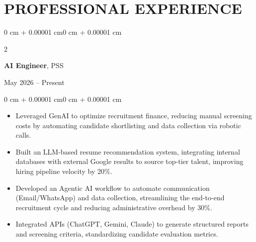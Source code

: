 \documentclass[9.5pt, letterpaper]{article}
\newenvironment{highlights}{
    \begin{itemize}[
        topsep=0pt,
        parsep=0pt,
        partopsep=0pt,
        itemsep=0pt,
        leftmargin=0 cm + 8pt
    ]
}{
    \end{itemize}
}
\newenvironment{onecolentry}{
    \begin{adjustwidth}{0 cm + 0.00001 cm}{0 cm + 0.00001 cm}
}{
    \end{adjustwidth}
}
\newenvironment{twocolentry}[2][]{
    \onecolentry
    \def\secondColumn{#2}
    \setcolumnwidth{\fill, 3.5 cm}
    \begin{paracol}{2}
}{
    \switchcolumn \raggedleft \secondColumn
    \end{paracol}
    \endonecolentry
}
\begin{document}
    \section{PROFESSIONAL EXPERIENCE}

    \begin{twocolentry}{May 2026 -- Present}
        \textbf{AI Engineer}, PSS
    \end{twocolentry}
    \vspace{0.01 cm}
    \begin{onecolentry}
        \begin{highlights}
            \item Leveraged GenAI to optimize recruitment finance, reducing manual screening costs by automating candidate shortlisting and data collection via robotic calls.
            \item Built an LLM-based resume recommendation system, integrating internal databases with external Google results to source top-tier talent, improving hiring pipeline velocity by 20\%.
            \item Developed an Agentic AI workflow to automate communication (Email/WhatsApp) and data collection, streamlining the end-to-end recruitment cycle and reducing administrative overhead by 30\%.
            \item Integrated APIs (ChatGPT, Gemini, Claude) to generate structured reports and screening criteria, standardizing candidate evaluation metrics.
        \end{highlights}
    \end{onecolentry}

    \vspace{0.01 cm}
\end{document}
